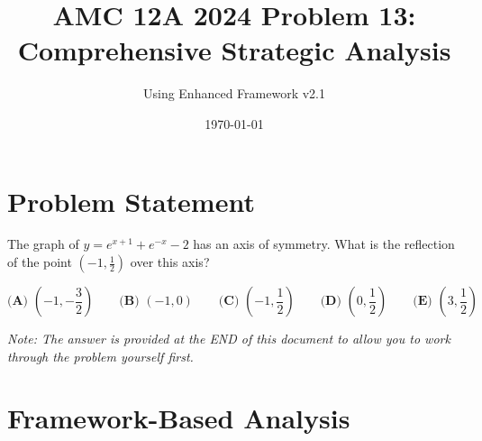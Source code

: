 \documentclass[12pt]{article}
\title{\textbf{AMC 12A 2024 Problem 13:\\Comprehensive Strategic Analysis}}
\author{Using Enhanced Framework v2.1}
\date{\today}
\begin{document}
\maketitle

\section*{Problem Statement}

The graph of $y=e^{x+1}+e^{-x}-2$ has an axis of symmetry. What is the reflection of the point $\left(-1,\frac{1}{2}\right)$ over this axis?

$$\textbf{(A) }\left(-1,-\frac{3}{2}\right)\qquad\textbf{(B) }(-1,0)\qquad\textbf{(C) }\left(-1,\frac{1}{2}\right)\qquad\textbf{(D) }\left(0,\frac{1}{2}\right)\qquad\textbf{(E) }\left(3,\frac{1}{2}\right)$$

\vspace{1em}
\noindent\textit{Note: The answer is provided at the END of this document to allow you to work through the problem yourself first.}

\section*{Framework-Based Analysis}
\end{document}
